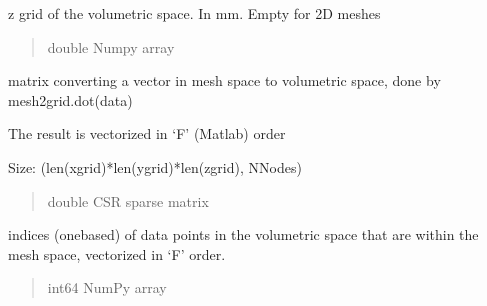\documentclass[letterpaper,10pt,english]{sphinxmanual}
\begin{document}
\begin{fulllineitems}
\begin{fulllineitems}
\end{fulllineitems}


\begin{fulllineitems}
\label{\detokenize{_autosummary/nirfasterff.base.data.meshvol:nirfasterff.base.data.meshvol.zgrid}}
\pysigstartsignatures
\pysigline
{}
\pysigstopsignatures
\sphinxAtStartPar
z grid of the volumetric space. In mm. Empty for 2D meshes
\begin{quote}\begin{description}
\sphinxAtStartPar
double Numpy array

\end{description}\end{quote}

\end{fulllineitems}


\begin{fulllineitems}
\label{\detokenize{_autosummary/nirfasterff.base.data.meshvol:nirfasterff.base.data.meshvol.mesh2grid}}
\pysigstartsignatures
\pysigline
{}
\pysigstopsignatures
\sphinxAtStartPar
matrix converting a vector in mesh space to volumetric space, done by mesh2grid.dot(data)

\sphinxAtStartPar
The result is vectorized in ‘F’ (Matlab) order

\sphinxAtStartPar
Size: (len(xgrid)*len(ygrid)*len(zgrid), NNodes)
\begin{quote}\begin{description}
\sphinxAtStartPar
double CSR sparse matrix

\end{description}\end{quote}

\end{fulllineitems}


\begin{fulllineitems}
\label{\detokenize{_autosummary/nirfasterff.base.data.meshvol:nirfasterff.base.data.meshvol.gridinmesh}}
\pysigstartsignatures
\pysigline
{}
\pysigstopsignatures
\sphinxAtStartPar
indices (one\sphinxhyphen{}based) of data points in the volumetric space that are within the mesh space, vectorized in ‘F’ order.
\begin{quote}\begin{description}
\sphinxAtStartPar
int64 NumPy array


\end{description}
\end{quote}
\end{fulllineitems}
\end{fulllineitems}
\end{document}
